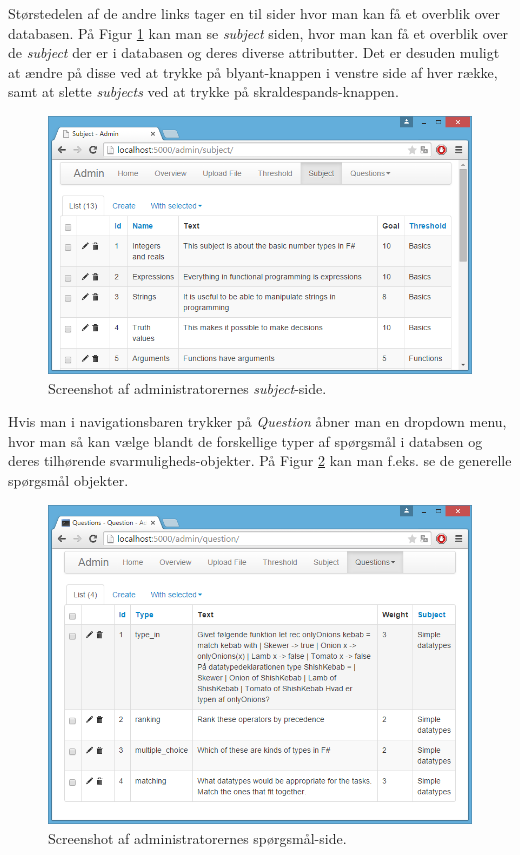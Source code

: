 \documentclass[11pt, a4paper]{article}
\begin{document}
Størstedelen af de andre links tager en til sider hvor man kan få et overblik over databasen. På Figur \ref{fig:screenshot_admin_subject} kan man se \emph{subject} siden, hvor man kan få et overblik over de \emph{subject} der er i databasen og deres diverse attributter. Det er desuden muligt at ændre på disse ved at trykke på blyant-knappen i venstre side af hver række, samt at slette \emph{subjects} ved at trykke på skraldespands-knappen.

\begin{figure}[htpb]
    \centering
    \includegraphics[width=1\linewidth]{figures/interface/admin_subject.png}
    \caption{Screenshot af administratorernes \emph{subject}-side.}
    \label{fig:screenshot_admin_subject}
\end{figure}

Hvis man i navigationsbaren trykker på \emph{Question} åbner man en dropdown menu, hvor man så kan vælge blandt de forskellige typer af spørgsmål i databsen og deres tilhørende svarmuligheds-objekter. På Figur \ref{fig:screenshot_admin_question} kan man f.eks. se de generelle spørgsmål objekter.

\begin{figure}[htpb]
    \centering
    \includegraphics[width=1\linewidth]{figures/interface/admin_question.png}
    \caption{Screenshot af administratorernes spørgsmål-side.}
    \label{fig:screenshot_admin_question}
\end{figure}
\end{document}
